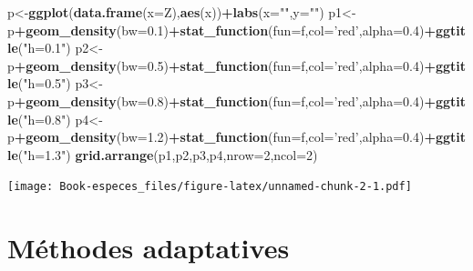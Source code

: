 \documentclass[
]{book}
\newenvironment{Shaded}{\begin{snugshade}}{\end{snugshade}}
\newcommand{\DataTypeTok}[1]{\textcolor[rgb]{0.13,0.29,0.53}{#1}}
\newcommand{\DecValTok}[1]{\textcolor[rgb]{0.00,0.00,0.81}{#1}}
\newcommand{\FloatTok}[1]{\textcolor[rgb]{0.00,0.00,0.81}{#1}}
\newcommand{\KeywordTok}[1]{\textcolor[rgb]{0.13,0.29,0.53}{\textbf{#1}}}
\newcommand{\NormalTok}[1]{#1}
\newcommand{\OperatorTok}[1]{\textcolor[rgb]{0.81,0.36,0.00}{\textbf{#1}}}
\newcommand{\StringTok}[1]{\textcolor[rgb]{0.31,0.60,0.02}{#1}}
\begin{document}
\begin{Shaded}
\begin{Highlighting}[]
\NormalTok{p<-}\KeywordTok{ggplot}\NormalTok{(}\KeywordTok{data.frame}\NormalTok{(}\DataTypeTok{x=}\NormalTok{Z),}\KeywordTok{aes}\NormalTok{(x))}\OperatorTok{+}\KeywordTok{labs}\NormalTok{(}\DataTypeTok{x=}\StringTok{""}\NormalTok{,}\DataTypeTok{y=}\StringTok{""}\NormalTok{)}
\NormalTok{p1<-p}\OperatorTok{+}\KeywordTok{geom_density}\NormalTok{(}\DataTypeTok{bw=}\FloatTok{0.1}\NormalTok{)}\OperatorTok{+}\KeywordTok{stat_function}\NormalTok{(}\DataTypeTok{fun=}\NormalTok{f,}\DataTypeTok{col=}\StringTok{'red'}\NormalTok{,}\DataTypeTok{alpha=}\FloatTok{0.4}\NormalTok{)}\OperatorTok{+}\KeywordTok{ggtitle}\NormalTok{(}\StringTok{"h=0.1"}\NormalTok{)}
\NormalTok{p2<-p}\OperatorTok{+}\KeywordTok{geom_density}\NormalTok{(}\DataTypeTok{bw=}\FloatTok{0.5}\NormalTok{)}\OperatorTok{+}\KeywordTok{stat_function}\NormalTok{(}\DataTypeTok{fun=}\NormalTok{f,}\DataTypeTok{col=}\StringTok{'red'}\NormalTok{,}\DataTypeTok{alpha=}\FloatTok{0.4}\NormalTok{)}\OperatorTok{+}\KeywordTok{ggtitle}\NormalTok{(}\StringTok{"h=0.5"}\NormalTok{)}
\NormalTok{p3<-p}\OperatorTok{+}\KeywordTok{geom_density}\NormalTok{(}\DataTypeTok{bw=}\FloatTok{0.8}\NormalTok{)}\OperatorTok{+}\KeywordTok{stat_function}\NormalTok{(}\DataTypeTok{fun=}\NormalTok{f,}\DataTypeTok{col=}\StringTok{'red'}\NormalTok{,}\DataTypeTok{alpha=}\FloatTok{0.4}\NormalTok{)}\OperatorTok{+}\KeywordTok{ggtitle}\NormalTok{(}\StringTok{"h=0.8"}\NormalTok{)}
\NormalTok{p4<-p}\OperatorTok{+}\KeywordTok{geom_density}\NormalTok{(}\DataTypeTok{bw=}\FloatTok{1.2}\NormalTok{)}\OperatorTok{+}\KeywordTok{stat_function}\NormalTok{(}\DataTypeTok{fun=}\NormalTok{f,}\DataTypeTok{col=}\StringTok{'red'}\NormalTok{,}\DataTypeTok{alpha=}\FloatTok{0.4}\NormalTok{)}\OperatorTok{+}\KeywordTok{ggtitle}\NormalTok{(}\StringTok{"h=1.3"}\NormalTok{)}
\KeywordTok{grid.arrange}\NormalTok{(p1,p2,p3,p4,}\DataTypeTok{nrow=}\DecValTok{2}\NormalTok{,}\DataTypeTok{ncol=}\DecValTok{2}\NormalTok{)}
\end{Highlighting}
\end{Shaded}

\texttt{[image: Book-especes\_files/figure-latex/unnamed-chunk-2-1.pdf]}

\hypertarget{muxe9thodes-adaptatives}{%
\section{Méthodes adaptatives}\label{muxe9thodes-adaptatives}}
\end{document}
